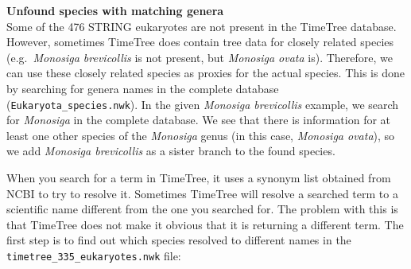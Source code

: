 \textbf{Unfound species with matching genera}\\
Some of the 476 STRING eukaryotes are not present in the TimeTree
database. However, sometimes TimeTree does contain tree data for closely
related species (e.g.~\emph{Monosiga brevicollis} is not present, but
\emph{Monosiga ovata} is). Therefore, we can use these closely related
species as proxies for the actual species. This is done by searching for
genera names in the complete database (\texttt{Eukaryota\_species.nwk}).
In the given \emph{Monosiga brevicollis} example, we search for
\emph{Monosiga} in the complete database. We see that there is
information for at least one other species of the \emph{Monosiga} genus
(in this case, \emph{Monosiga ovata}), so we add \emph{Monosiga
brevicollis} as a sister branch to the found species.

When you search for a term in TimeTree, it uses a synonym list obtained
from NCBI to try to resolve it. Sometimes TimeTree will resolve a
searched term to a scientific name different from the one you searched
for. The problem with this is that TimeTree does not make it obvious
that it is returning a different term. The first step is to find out
which species resolved to different names in the
\texttt{timetree\_335\_eukaryotes.nwk} file:

\begin{Shaded}
\end{Shaded}

